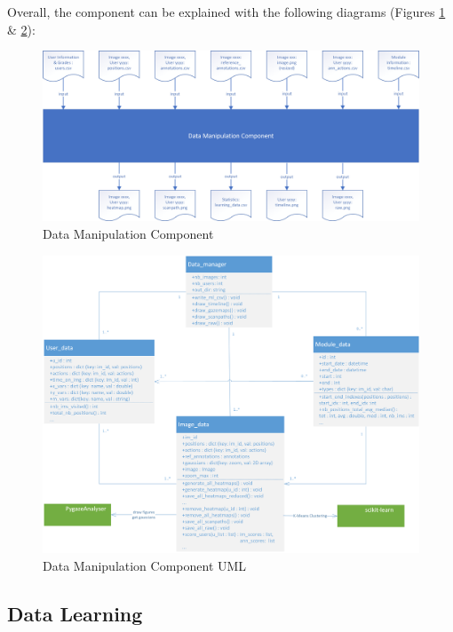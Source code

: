 \documentclass[a4paper,11pt]{report}
\numberwithin{figure}{section} %
\begin{document}
    Overall, the component can be explained with the following diagrams (Figures \ref{fig:comp2} \& \ref{fig:comp2uml}):
    \begin{figure}[H]
      \centering
      \includegraphics[width=.9\linewidth]{diagrams/module2.png}
      \caption{Data Manipulation Component}
      \label{fig:comp2}
    \end{figure}

    \begin{figure}[H]
      \centering
      \includegraphics[width=.9\linewidth]{diagrams/module2uml.png}
      \caption{Data Manipulation Component UML}
      \label{fig:comp2uml}
    \end{figure}

    \subsection{Data Learning}
\end{document}
